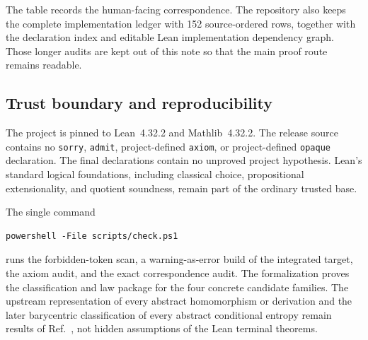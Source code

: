 \documentclass[aps,pra,11pt,onecolumn,nofootinbib,tightenlines]{revtex4-2}
\newcommand{\LeanDecl}[1]{\path{#1}}
\begin{document}
The table records the human-facing correspondence. The repository also keeps
the complete implementation ledger with 152 source-ordered rows, together with
the declaration index and editable Lean implementation dependency graph. Those longer
audits are kept out of this note so that the main proof route remains readable.

\subsection{Trust boundary and reproducibility}

The project is pinned to Lean~4.32.2 and Mathlib~4.32.2. The release source
contains no \texttt{sorry}, \texttt{admit}, project-defined \texttt{axiom}, or
project-defined \texttt{opaque} declaration. The final declarations contain no
unproved project hypothesis. Lean's standard logical foundations, including
classical choice, propositional extensionality, and quotient soundness, remain
part of the ordinary trusted base.

The single command
\begin{verbatim}
powershell -File scripts/check.ps1
\end{verbatim}
runs the forbidden-token scan, a warning-as-error build of the integrated
\LeanDecl{CompleteCharacterization} target, the axiom audit, and the exact
correspondence audit. The formalization proves the classification and law
package for the four concrete candidate families. The upstream representation
of every abstract homomorphism or derivation and the later barycentric
classification of every abstract conditional entropy remain results of
Ref.~\cite{rubboli2026complete}, not hidden assumptions of the Lean terminal
theorems.


\renewcommand{\bibfont}{\footnotesize}

\end{document}
